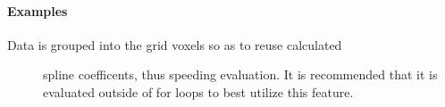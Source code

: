 \documentclass[letterpaper,10pt,english]{sphinxmanual}
\begin{document}
\begin{fulllineitems}
\begin{fulllineitems}
\paragraph{Examples}
\begin{description}
\item[{Data is grouped into the grid voxels so as to reuse calculated}] \leavevmode
spline coefficents, thus speeding evaluation.  It is
recommended that it is evaluated outside of for loops to best
utilize this feature.

\end{description}

\end{fulllineitems}


\end{fulllineitems}

\end{document}
